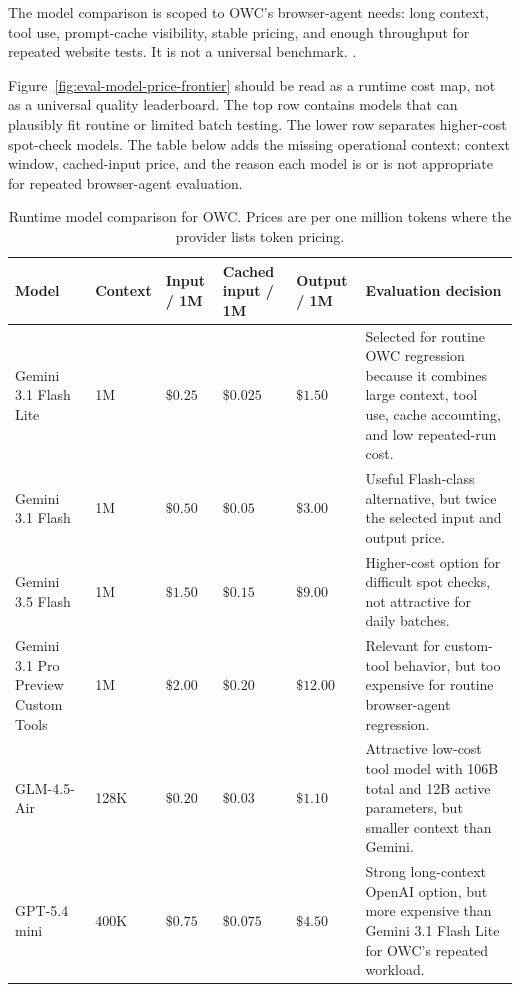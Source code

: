The model comparison is scoped to OWC's browser-agent needs: long context, tool use,
prompt-cache visibility, stable pricing, and enough throughput for repeated website
tests. It is not a universal benchmark.
\cite{gemini-pricing,gemini-caching,gemini-rate-limits,zai-pricing,zai-glm45,
openai-gpt54-mini}.



Figure~\ref{fig:eval-model-price-frontier} should be read as a runtime cost map, not
as a universal quality leaderboard. The top row contains models that can plausibly fit
routine or limited batch testing. The lower row separates higher-cost spot-check
models. The table below adds the missing operational context:
context window, cached-input price, and the reason each model is or is not appropriate
for repeated browser-agent evaluation.



\begin{table}[H]
\centering
\begingroup
\scriptsize
\setlength{\tabcolsep}{3.5pt}
\renewcommand{\arraystretch}{1.15}
\begin{tabularx}{\textwidth}{Q{2.55cm}Z{1.35cm}Z{1.55cm}Z{1.65cm}Z{1.55cm}Y}
\toprule
{}
Model & Context & Input / 1M & Cached input / 1M & Output / 1M & Evaluation decision \\
\midrule
Gemini 3.1 Flash Lite & 1M & \(\$0.25\) & \(\$0.025\) & \(\$1.50\) &
Selected for routine OWC regression because it combines large context, tool use, cache
accounting, and low repeated-run cost. \\
Gemini 3.1 Flash & 1M & \(\$0.50\) & \(\$0.05\) & \(\$3.00\) &
Useful Flash-class alternative, but twice the selected input and output price. \\
Gemini 3.5 Flash & 1M & \(\$1.50\) & \(\$0.15\) & \(\$9.00\) &
Higher-cost option for difficult spot checks, not attractive for daily batches. \\
Gemini 3.1 Pro Preview Custom Tools & 1M & \(\$2.00\) & \(\$0.20\) &
\(\$12.00\) & Relevant for custom-tool behavior, but too expensive for routine
browser-agent regression. \\
GLM-4.5-Air & 128K & \(\$0.20\) & \(\$0.03\) & \(\$1.10\) &
Attractive low-cost tool model with 106B total and 12B active parameters, but smaller
context than Gemini. \\
GPT-5.4 mini & 400K & \(\$0.75\) & \(\$0.075\) & \(\$4.50\) &
Strong long-context OpenAI option, but more expensive than Gemini 3.1 Flash Lite for
OWC's repeated workload. \\
\bottomrule
\end{tabularx}
\endgroup
\caption{Runtime model comparison for OWC. Prices are per one million tokens where the
provider lists token pricing.}
\label{tab:eval-runtime-models}
\end{table}

